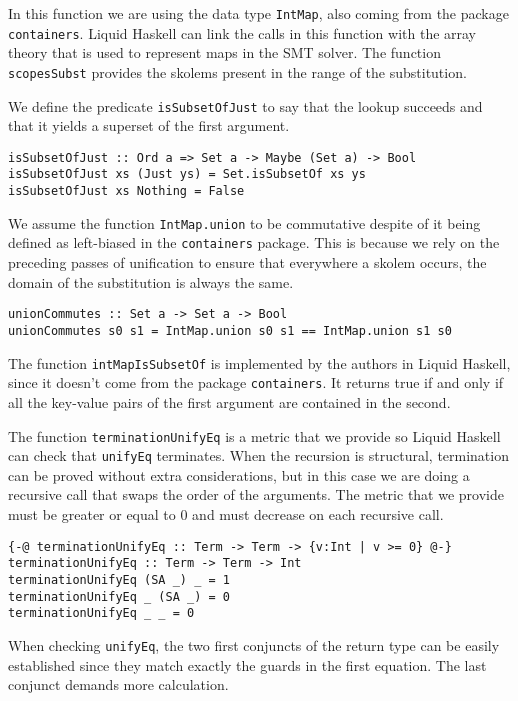\documentclass[sigconf, anonymous, review]{acmart}
\newcommand{\tc}[1]{{\small\texttt{#1}}}
\begin{document}
In this function we are using the data type \tc{IntMap}, also coming from the
package \tc{containers}. Liquid Haskell can link the calls in this function
with the array theory that is used to represent maps in the SMT solver.
The function \tc{scopesSubst} provides the skolems present in the range of
the substitution.

We define the predicate \tc{isSubsetOfJust} to say that the lookup succeeds
and that it yields a superset of the first argument.

\begin{verbatim}
isSubsetOfJust :: Ord a => Set a -> Maybe (Set a) -> Bool
isSubsetOfJust xs (Just ys) = Set.isSubsetOf xs ys
isSubsetOfJust xs Nothing = False
\end{verbatim}

We assume the function \tc{IntMap.union} to be commutative despite of it being
defined as left-biased in the \tc{containers} package. This is because we
rely on the preceding passes of unification to ensure that everywhere a
skolem occurs, the domain of the substitution is always the same.

\begin{verbatim}
unionCommutes :: Set a -> Set a -> Bool
unionCommutes s0 s1 = IntMap.union s0 s1 == IntMap.union s1 s0
\end{verbatim}

The function \tc{intMapIsSubsetOf} is implemented by the authors in Liquid
Haskell, since it doesn't come from the package \tc{containers}. It returns
true if and only if all the key-value pairs of the first argument are contained
in the second.

The function \tc{terminationUnifyEq} is a metric that we provide so Liquid
Haskell can check that \tc{unifyEq} terminates. When the recursion is
structural, termination can be proved without extra considerations, but in
this case we are doing a recursive call that swaps the order of the arguments.
The metric that we provide must be greater or equal to 0 and must decrease on
each recursive call.

\begin{verbatim}
{-@ terminationUnifyEq :: Term -> Term -> {v:Int | v >= 0} @-}
terminationUnifyEq :: Term -> Term -> Int
terminationUnifyEq (SA _) _ = 1
terminationUnifyEq _ (SA _) = 0
terminationUnifyEq _ _ = 0
\end{verbatim}

When checking \tc{unifyEq}, the two first conjuncts of the return type can
be easily established since they match exactly the guards in the first equation.
The last conjunct demands more calculation.
\end{document}
